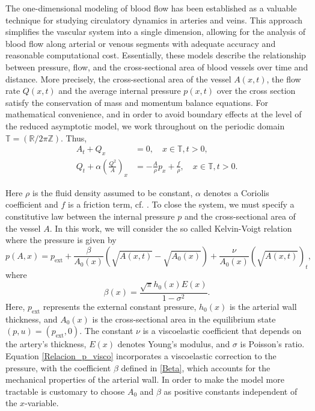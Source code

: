 \documentclass[reqno]{amsart}
\theoremstyle{definition}
\numberwithin{equation}{section}
\numberwithin{theorem}{section}
\numberwithin{definition}{section}
\begin{document}
The one-dimensional modeling of blood flow has been established as a valuable technique for studying circulatory dynamics in arteries and veins. This approach simplifies the vascular system into a single dimension, allowing for the analysis of blood flow along arterial or venous segments with adequate accuracy and reasonable computational cost. Essentially, these models describe the relationship between pressure, flow, and the cross-sectional area of blood vessels over time and distance. More precisely, the cross-sectional area of the vessel $A(x,t)$, the flow rate $Q(x,t)$ and the average internal pressure $p(x,t)$ over the cross section satisfy the conservation of mass and momentum balance equations. For mathematical convenience, and in order to avoid boundary effects at the level of the reduced asymptotic model, we work throughout on the periodic domain $\mathbb{T}=(\mathbb{R}/2\pi\mathbb{Z})$. Thus,
\begin{subequations}\label{sistema:1}
    \begin{align}
        A_t + Q_x &= 0, \quad x\in \mathbb{T}, t>0,\\
        Q_t + \alpha\left(\frac{Q^2}{A}\right)_x &= -\frac{A}{\rho}p_x + \frac{f}{\rho},  \quad x\in \mathbb{T}, t>0.
    \end{align}
\end{subequations}

Here $\rho$ is the fluid density assumed to be constant, $\alpha$ denotes a Coriolis coefficient and $f$ is a friction term, cf. \cite{one_dimen}.  To close the system, we must specify a constitutive law between the internal pressure $p$ and the cross-sectional area of the vessel $A$. In this work, we will consider the so called Kelvin-Voigt relation where the pressure is given by
\begin{equation}\label{Relacion_p_visco}
    p(A,x)= p_{\text{ext}} + \frac{\beta}{A_0(x)}\left(\sqrt{A(x,t)} - \sqrt{A_0(x)}\right) + \frac{\nu}{A_0(x)}(\sqrt{A(x,t)})_t,
\end{equation}
where
\begin{equation}\label{Beta}
    \beta(x) = \frac{\sqrt{\pi} h_0(x) E(x)}{1-\sigma^2}.
\end{equation}
Here, \( p_{\text{ext}} \) represents the external constant pressure, \( h_0(x)\) is the arterial wall thickness, and \( A_0(x) \) is the cross-sectional area in the equilibrium state \((p, u) = (p_{\text{ext}}, 0)\). The constant \( \nu \) is a viscoelastic coefficient that depends on the artery's thickness, \( E(x) \) denotes Young’s modulus, and \( \sigma \) is Poisson’s ratio. Equation \eqref{Relacion_p_visco} incorporates a viscoelastic correction to the pressure, with the coefficient \( \beta \) defined in \eqref{Beta}, which accounts for the mechanical properties of the arterial wall.  In order to make the model more tractable is customary to choose $A_{0}$ and $\beta$ as positive constants independent of the $x$-variable.\medskip
\\
\end{document}
